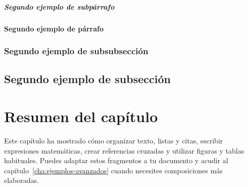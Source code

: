 \subparagraph{Segundo ejemplo de subpárrafo}
\label{sec:subparagraph-2}

\paragraph{Segundo ejemplo de párrafo}
\label{sec:paragraph-2}

\subsubsection{Segundo ejemplo de subsubsección}
\label{sec:subsubseccion-2}

\subsection{Segundo ejemplo de subsección}
\label{sec:subseccion-2}



\section{Resumen del capítulo}
\label{sec:resumen-elementos-basicos}

Este capítulo ha mostrado cómo organizar texto, listas y citas, escribir expresiones matemáticas, crear referencias cruzadas y utilizar figuras y tablas habituales. Puedes adaptar estos fragmentos a tu documento y acudir al capítulo~\ref{cha:ejemplos-avanzados} cuando necesites composiciones más elaboradas.

